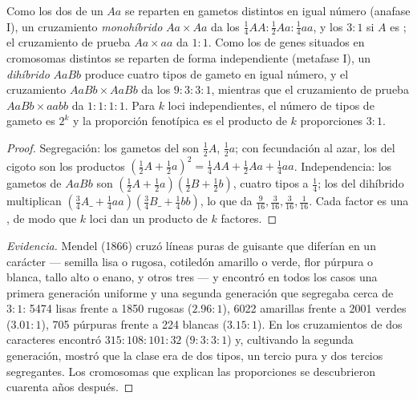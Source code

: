 \begin{theorem}\label{thm:b2:meiosis-heredity:mendel}
Como los dos  de un  $Aa$ se reparten en gametos
distintos en igual número (anafase I), un cruzamiento \emph{monohíbrido}
$Aa \times Aa$ da los  $\tfrac14 AA : \tfrac12 Aa :
\tfrac14 aa$, y los  $3 : 1$ si $A$ es ; el cruzamiento
de prueba $Aa \times aa$ da $1 : 1$. Como los  de genes situados
en cromosomas distintos se reparten de forma independiente (metafase I),
un \emph{dihíbrido} $AaBb$ produce cuatro tipos de gameto en igual número,
y el cruzamiento
$AaBb \times AaBb$ da los  $9 : 3 : 3 : 1$, mientras que el
cruzamiento de prueba $AaBb \times aabb$ da $1 : 1 : 1 : 1$. Para $k$
loci  independientes, el número de tipos de gameto es $2^k$
y la proporción fenotípica es el producto de $k$ proporciones $3 : 1$.
\end{theorem}
\begin{proof}
Segregación: los gametos del  son $\tfrac12 A$,
$\tfrac12 a$; con fecundación al azar, los  del cigoto son los
productos $(\tfrac12 A + \tfrac12 a)^2 = \tfrac14 AA + \tfrac12 Aa +
\tfrac14 aa$. Independencia: los gametos de $AaBb$ son $(\tfrac12 A
+ \tfrac12 a)(\tfrac12 B + \tfrac12 b)$, cuatro tipos a $\tfrac14$;
los  del dihíbrido multiplican $(\tfrac34 A\_ + \tfrac14 aa)
(\tfrac34 B\_ + \tfrac14 bb)$, lo que da $\tfrac{9}{16}, \tfrac{3}{16},
\tfrac{3}{16}, \tfrac{1}{16}$. Cada factor es una , de modo que $k$ loci dan un producto de $k$ factores.
\end{proof}
\begin{proof}[Evidencia]
Mendel (1866) cruzó líneas puras de guisante que diferían en un carácter
--- semilla lisa o rugosa, cotiledón amarillo o verde, flor púrpura o
blanca, tallo alto o enano, y otros tres --- y encontró en todos los
casos una primera generación uniforme y una segunda generación que
segregaba cerca de $3 : 1$: 5474 lisas frente a 1850 rugosas ($2.96 :
1$), 6022 amarillas frente a 2001 verdes ($3.01 : 1$), 705 púrpuras frente
a 224 blancas
($3.15 : 1$). En los cruzamientos de dos caracteres encontró $315 : 108 : 101 :
32$ ($9 : 3 : 3 : 1$) y, cultivando la segunda generación, mostró que la
clase  era de dos tipos, un tercio pura y dos tercios
segregantes. Los cromosomas que explican las proporciones se
descubrieron cuarenta años después.
\end{proof}

